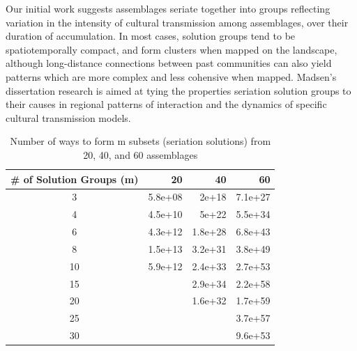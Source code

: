 \documentclass[preprint,times,authoryear,12pt]{els-workingpaper}
\begin{document}
Our initial work suggests assemblages seriate together into groups reflecting variation in the intensity of cultural transmission among assemblages, over their duration of accumulation. In most cases, solution groups tend to be spatiotemporally compact, and form clusters when mapped on the landscape, although long-distance connections between past communities can also yield patterns which are more complex and less cohensive when mapped.  Madsen's dissertation research is aimed at tying the properties seriation solution groups to their causes in regional patterns of interaction and the dynamics of specific cultural transmission models.  

\begin{table}[ht]
\centering
\begin{tabular}{|c|r|r|r|}
  \hline
\# of Solution Groups (m) & 20 & 40 & 60 \\ 
  \hline
  3 & 5.8e+08 & 2e+18 & 7.1e+27 \\ 
    4 & 4.5e+10 & 5e+22 & 5.5e+34 \\ 
    6 & 4.3e+12 & 1.8e+28 & 6.8e+43 \\ 
    8 & 1.5e+13 & 3.2e+31 & 3.8e+49 \\ 
   10 & 5.9e+12 & 2.4e+33 & 2.7e+53 \\ 
   15 &  & 2.9e+34 & 2.2e+58 \\ 
   20 &  & 1.6e+32 & 1.7e+59 \\ 
   25 &  &  & 3.7e+57 \\ 
   30 &  &  & 9.6e+53 \\ 
   \hline
\end{tabular}
\caption{Number of ways to form m subsets (seriation solutions) from 20, 40, and 60 assemblages} 
\label{tab:subsets}
\end{table}

\end{document}
